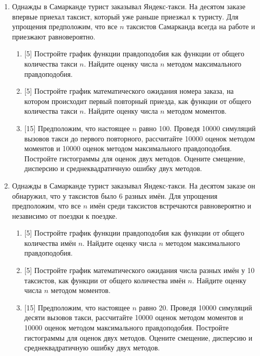 \documentclass[12pt]{article} %
\begin{document}
\begin{enumerate}

    \item Однажды в Самарканде турист заказывал Яндекс-такси. 
    На десятом заказе впервые приехал таксист, который уже раньше приезжал к туристу. 
    Для упрощения предположим, что все $n$ таксистов Самарканда всегда на работе и приезжают равновероятно.

    \begin{enumerate}
      \item {[5]} Постройте график функции правдоподобия как функции от общего количества такси $n$. 
      Найдите оценку числа $n$ методом максимального правдоподобия. 
      \item {[5]} Постройте график математического ожидания номера заказа, 
      на котором происходит первый повторный приезда, как функции от общего количества такси $n$. 
      Найдите оценку числа $n$ методом моментов.
      \item {[15]} Предположим, что настоящее $n$ равно 100. 
      Проведя 10000 симуляций вызовов такси до первого повторного, рассчитайте 10000 оценок методом моментов и 10000 оценок методом максимального правдоподобия. 
      Постройте гистограммы для оценок двух методов. 
      Оцените смещение, дисперсию и среднеквадратичную ошибку двух методов. 
    \end{enumerate}

    \item Однажды в Самарканде турист заказывал Яндекс-такси. 
    На десятом заказе он обнаружил, что у таксистов было 6 разных имён.
    Для упрощения предположим, что все $n$ имён среди таксистов встречаются равновероятно и независимо от 
    поездки к поездке. 

    \begin{enumerate}
      \item {[5]} Постройте график функции правдоподобия как функции от общего количества имён $n$. 
      Найдите оценку числа $n$ методом максимального правдоподобия. 
      \item {[5]} Постройте график математического ожидания числа разных имён у 10 таксистов, 
      как функции от общего количества имён $n$. 
      Найдите оценку числа $n$ методом моментов.
      \item {[15]} Предположим, что настоящее $n$ равно 20. 
      Проведя 10000 симуляций десяти вызовов такси, рассчитайте 10000 оценок методом моментов и 10000 оценок методом максимального правдоподобия. 
      Постройте гистограммы для оценок двух методов. 
      Оцените смещение, дисперсию и среднеквадратичную ошибку двух методов. 
    \end{enumerate}


\end{enumerate}
\end{document}
